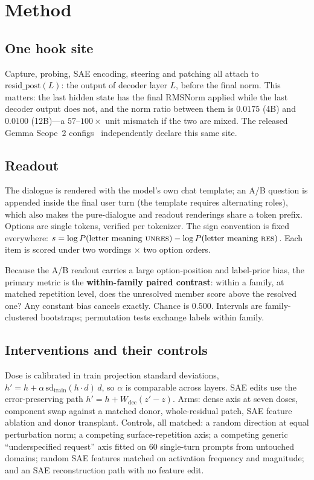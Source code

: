 \documentclass[conference]{IEEEtran}
\begin{document}
\section{Method}
\label{sec:method}

\subsection{One hook site}
Capture, probing, SAE encoding, steering and patching all attach to
$\mathrm{resid\_post}(L)$: the output of decoder layer $L$, before the final norm. This matters:
the last hidden state has the final RMSNorm applied while the last decoder output does not, and the
norm ratio between them is $0.0175$ (4B) and $0.0100$ (12B)---a $57$--$100\times$ unit mismatch if
the two are mixed. The released Gemma Scope~2 configs~\cite{gemmascope} independently declare this same site.

\subsection{Readout}
The dialogue is rendered with the model's own chat template; an A/B question is appended inside the
final user turn (the template requires alternating roles), which also makes the pure-dialogue and
readout renderings share a token prefix. Options are single tokens, verified per tokenizer. The
sign convention is fixed everywhere:
$s=\log P(\text{letter meaning \textsc{unres}})-\log P(\text{letter meaning \textsc{res}})$.
Each item is scored under two wordings $\times$ two option orders.

Because the A/B readout carries a large option-position and label-prior bias, the primary metric is
the \textbf{within-family paired contrast}: within a family, at matched repetition level, does the
unresolved member score above the resolved one? Any constant bias cancels exactly. Chance is
$0.500$. Intervals are family-clustered bootstraps; permutation tests exchange labels within family.

\subsection{Interventions and their controls}
Dose is calibrated in train projection standard deviations,
$h'=h+\alpha\,\mathrm{sd}_{\text{train}}(h\!\cdot\!d)\,d$, so $\alpha$ is comparable across layers.
SAE edits use the error-preserving path $h'=h+W_{\text{dec}}(z'-z)$. Arms: dense axis at seven
doses, component swap against a matched donor, whole-residual patch, SAE feature ablation and donor
transplant. Controls, all matched: a random direction at equal perturbation norm; a competing
surface-repetition axis; a competing generic ``underspecified request'' axis fitted on 60
single-turn prompts from untouched domains; random SAE features matched on activation frequency and
magnitude; and an SAE reconstruction path with no feature edit.
\end{document}
